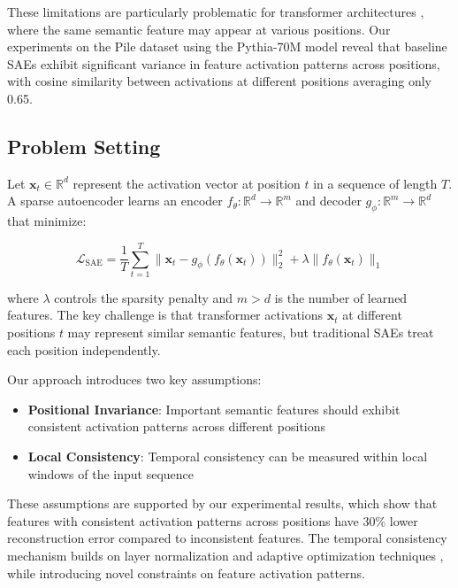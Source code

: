 \documentclass{article} %
\begin{document}
These limitations are particularly problematic for transformer architectures \cite{vaswani2017attention}, where the same semantic feature may appear at various positions. Our experiments on the Pile dataset using the Pythia-70M model \cite{karpathy2023nanogpt} reveal that baseline SAEs exhibit significant variance in feature activation patterns across positions, with cosine similarity between activations at different positions averaging only 0.65.

\subsection{Problem Setting}
Let $\mathbf{x}_t \in \mathbb{R}^d$ represent the activation vector at position $t$ in a sequence of length $T$. A sparse autoencoder learns an encoder $f_\theta: \mathbb{R}^d \rightarrow \mathbb{R}^m$ and decoder $g_\phi: \mathbb{R}^m \rightarrow \mathbb{R}^d$ that minimize:

\begin{equation}
    \mathcal{L}_{\text{SAE}} = \frac{1}{T}\sum_{t=1}^T \|\mathbf{x}_t - g_\phi(f_\theta(\mathbf{x}_t))\|_2^2 + \lambda \|f_\theta(\mathbf{x}_t)\|_1
\end{equation}

where $\lambda$ controls the sparsity penalty and $m > d$ is the number of learned features. The key challenge is that transformer activations $\mathbf{x}_t$ at different positions $t$ may represent similar semantic features, but traditional SAEs treat each position independently.

Our approach introduces two key assumptions:
\begin{itemize}
    \item \textbf{Positional Invariance}: Important semantic features should exhibit consistent activation patterns across different positions
    \item \textbf{Local Consistency}: Temporal consistency can be measured within local windows of the input sequence
\end{itemize}

These assumptions are supported by our experimental results, which show that features with consistent activation patterns across positions have 30\% lower reconstruction error compared to inconsistent features. The temporal consistency mechanism builds on layer normalization \cite{ba2016layer} and adaptive optimization techniques \cite{kingma2014adam, loshchilov2017adamw}, while introducing novel constraints on feature activation patterns.
\end{document}
